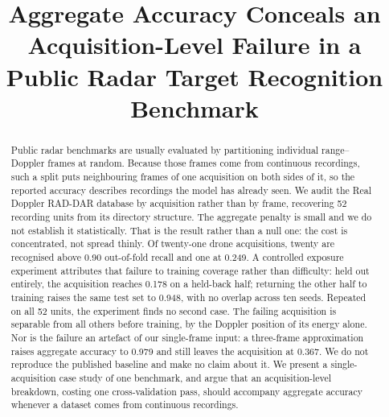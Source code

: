 \documentclass[conference]{IEEEtran}
\begin{document}
\title{Aggregate Accuracy Conceals an Acquisition-Level Failure in a Public Radar Target Recognition Benchmark}

\newif\ifblind
\blindtrue

\ifblind
  \newcommand{\anon}[1]{\textsc{[anonymised]}}
  \newcommand{\codeurl}{a repository archived with the submission}
  \author{\IEEEauthorblockN{}\IEEEauthorblockA{}}
\else
  \newcommand{\anon}[1]{#1}
  \newcommand{\codeurl}{\url{github.com/falcon-colab/rdrd-acquisition-coverage}}
  \author{\IEEEauthorblockN{Ghulam Mustafa, Ghulam Murtaza, Ali Nawaz, Zohaib Ahmad Khan, Raja Farrukh Ali}
  \IEEEauthorblockA{\textit{College of Aeronautical Engineering} \\
  \textit{National University of Sciences and Technology}\\
  Islamabad, Pakistan \\
  gmustafa.ms19avecae@student.nust.edu.pk; murtaza.sab2@gmail.com; alinawaz1302@gmail.com; zakhan@cae.nust.edu.pk}
  }
\fi

\maketitle

\begin{abstract}
Public radar benchmarks are usually evaluated by partitioning individual range--Doppler frames at random. Because those frames come from continuous recordings, such a split puts neighbouring frames of one acquisition on both sides of it, so the reported accuracy describes recordings the model has already seen. We audit the Real Doppler RAD-DAR database by acquisition rather than by frame, recovering 52 recording units from its directory structure. The aggregate penalty is small and we do not establish it statistically. That is the result rather than a null one: the cost is concentrated, not spread thinly. Of twenty-one drone acquisitions, twenty are recognised above 0.90 out-of-fold recall and one at 0.249. A controlled exposure experiment attributes that failure to training coverage rather than difficulty: held out entirely, the acquisition reaches 0.178 on a held-back half; returning the other half to training raises the same test set to 0.948, with no overlap across ten seeds. Repeated on all 52 units, the experiment finds no second case. The failing acquisition is separable from all others before training, by the Doppler position of its energy alone. Nor is the failure an artefact of our single-frame input: a three-frame approximation raises aggregate accuracy to 0.979 and still leaves the acquisition at 0.367. We do not reproduce the published baseline and make no claim about it. We present a single-acquisition case study of one benchmark, and argue that an acquisition-level breakdown, costing one cross-validation pass, should accompany aggregate accuracy whenever a dataset comes from continuous recordings.
\end{abstract}
\end{document}
